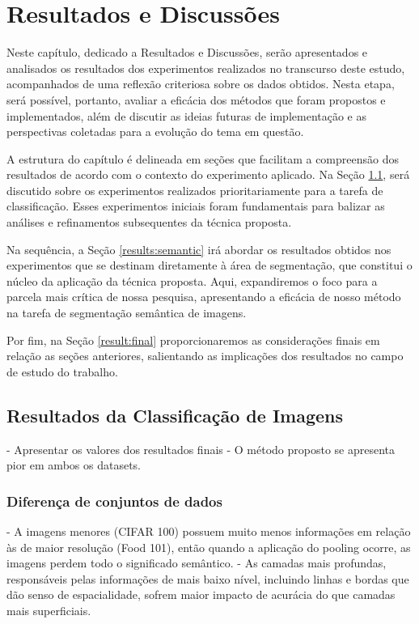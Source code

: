 \newpage
\clearpage

\section{Resultados e Discussões}
\label{results}
Neste capítulo, dedicado a Resultados e Discussões, serão apresentados e analisados os resultados dos experimentos realizados no transcurso deste estudo, acompanhados de uma reflexão criteriosa sobre os dados obtidos. Nesta etapa, será possível, portanto, avaliar a eficácia dos métodos que foram propostos e implementados, além de discutir as ideias futuras de implementação e as perspectivas coletadas para a evolução do tema em questão.

A estrutura do capítulo é delineada em seções que facilitam a compreensão dos resultados de acordo com o contexto do experimento aplicado. Na Seção \ref{results:class}, será discutido sobre os experimentos realizados prioritariamente para a tarefa de classificação. Esses experimentos iniciais foram fundamentais para balizar as análises e refinamentos subsequentes da técnica proposta.

Na sequência, a Seção \ref{results:semantic} irá abordar os resultados obtidos nos experimentos que se destinam diretamente à área de segmentação, que constitui o núcleo da aplicação da técnica proposta. Aqui, expandiremos o foco para a parcela mais crítica de nossa pesquisa, apresentando a eficácia de nosso método na tarefa de segmentação semântica de imagens.

Por fim, na Seção \ref{result:final} proporcionaremos as considerações finais em relação as seções anteriores, salientando as implicações dos resultados no campo de estudo do trabalho.

\subsection{Resultados da Classificação de Imagens}
\label{results:class}
- Apresentar os valores dos resultados finais
- O método proposto se apresenta pior em ambos os datasets.

\subsubsection{Diferença de conjuntos de dados}
\label{results:class:datasets}
- A imagens menores (CIFAR 100) possuem muito menos informações em relação às de maior resolução (Food 101), então quando a aplicação do pooling ocorre, as imagens perdem todo o significado semântico.
- As camadas mais profundas, responsáveis pelas informações de mais baixo nível, incluindo linhas e bordas que dão senso de espacialidade, sofrem maior impacto de acurácia do que camadas mais superficiais.

